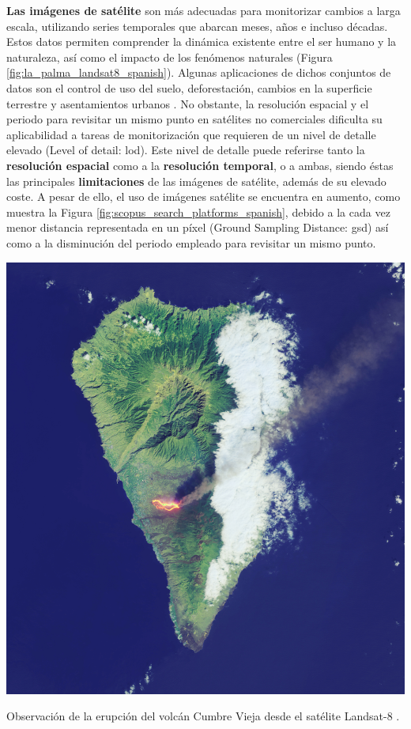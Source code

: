 \textbf{Las imágenes de satélite} son más adecuadas para monitorizar cambios a larga escala, utilizando series temporales que abarcan meses, años e incluso décadas. Estos datos permiten comprender la dinámica existente entre el ser humano y la naturaleza, así como el impacto de los fenómenos naturales (Figura \ref{fig:la_palma_landsat8_spanish}). Algunas aplicaciones de dichos conjuntos de datos son el control de uso del suelo, deforestación, cambios en la superficie terrestre y asentamientos urbanos \cite{asokan_change_2019}. No obstante, la resolución espacial y el periodo para revisitar un mismo punto en satélites no comerciales dificulta su aplicabilidad a tareas de monitorización que requieren de un nivel de detalle elevado (Level of detail: \acrshort{lod}). Este nivel de detalle puede referirse tanto la \textbf{resolución espacial} como a la \textbf{resolución temporal}, o a ambas, siendo éstas las principales \textbf{limitaciones} de las imágenes de satélite, además de su elevado coste. A pesar de ello, el uso de imágenes satélite se encuentra en aumento, como muestra la Figura \ref{fig:scopus_search_platforms_spanish}, debido a la cada vez menor distancia representada en un píxel (Ground Sampling Distance: \acrshort{gsd}) así como a la disminución del periodo empleado para revisitar un mismo punto. 
\begin{marginfigure}[-6cm]
	\includegraphics{figs/introduction/landsat8_lapalma.jpg}
	\caption{Observación de la erupción del volcán Cumbre Vieja desde el satélite Landsat-8  \cite{nasa_earth_observatory_lava_2021}.}
	\label{fig:la_palma_landsat8_spanish}
\end{marginfigure}

